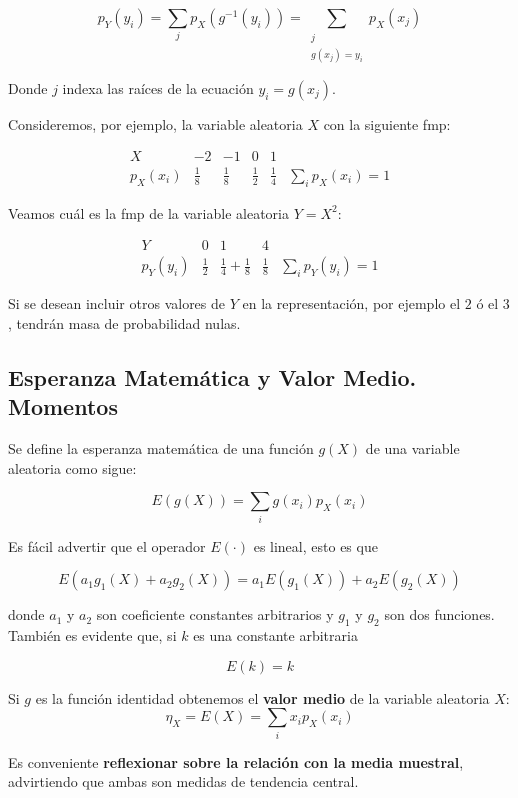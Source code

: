 \documentclass[11pt]{article}
\begin{document}
\[p_Y(y_i) = \sum_j p_X(g^{-1}(y_i))
= \sum_{\substack{j \\ g(x_j) = y_i}}p_X(x_j)\]

Donde \(j\) indexa las raíces de la ecuación \(y_i=g(x_j)\).

    Consideremos, por ejemplo, la variable aleatoria \(X\) con la siguiente
fmp:

\[
\begin{array}{c|cccc|c}
X & -2 & -1 & 0 & 1\\
\hline
p_X(x_i) & \frac{1}{8} & \frac{1}{8} & \frac{1}{2} & \frac{1}{4} & \sum_i p_X(x_i) = 1
\end{array}
\]

Veamos cuál es la fmp de la variable aleatoria \(Y = X^2\):

\[
\begin{array}{c|ccc|c}
Y & 0 & 1 & 4\\
\hline
p_Y(y_i) & \frac{1}{2} & \frac{1}{4}+\frac{1}{8} & \frac{1}{8} & \sum_i p_Y(y_i) = 1
\end{array}
\]

Si se desean incluir otros valores de \(Y\) en la representación, por
ejemplo el \(2\) ó el \(3\), tendrán masa de probabilidad nulas.

    \hypertarget{esperanza-matemuxe1tica-y-valor-medio.-momentos}{%
\subsection*{Esperanza Matemática y Valor Medio.
Momentos}\label{esperanza-matemuxe1tica-y-valor-medio.-momentos}}

Se define la esperanza matemática de una función \(g(X)\) de una
variable aleatoria como sigue:

\[E(g(X))=\sum_i g(x_i)p_X(x_i)\]

Es fácil advertir que el operador \(E(·)\) es lineal, esto es que

\[E(a_1g_1(X)+a_2g_2(X))=a_1E(g_1(X)) + a_2E(g_2(X))\]

donde \(a_1\) y \(a_2\) son coeficiente constantes arbitrarios y \(g_1\)
y \(g_2\) son dos funciones. También es evidente que, si \(k\) es una
constante arbitraria

\[E(k) = k\]

    Si \(g\) es la función identidad obtenemos el \textbf{valor medio} de la
variable aleatoria \(X\): \[\eta_X=E(X)=\sum_i x_ip_X(x_i)\]

Es conveniente \textbf{reflexionar sobre la relación con la media
muestral}, advirtiendo que ambas son medidas de tendencia central.
\end{document}
